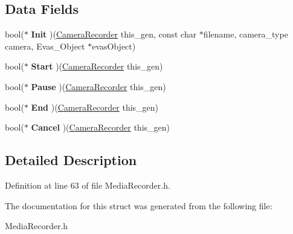 \subsection*{Data Fields}
\begin{DoxyCompactItemize}
\item 
\hypertarget{struct__CameraRecorder_a3e6b2c98f714ddad1dc9d44ebe0d9efe}{bool($\ast$ {\bfseries Init} )(\hyperlink{struct__CameraRecorder}{Camera\-Recorder} this\-\_\-gen, const char $\ast$filename, camera\-\_\-type camera, Evas\-\_\-\-Object $\ast$evas\-Object)}\label{struct__CameraRecorder_a3e6b2c98f714ddad1dc9d44ebe0d9efe}

\item 
\hypertarget{struct__CameraRecorder_ae43053507ae72e6626706b58714b1933}{bool($\ast$ {\bfseries Start} )(\hyperlink{struct__CameraRecorder}{Camera\-Recorder} this\-\_\-gen)}\label{struct__CameraRecorder_ae43053507ae72e6626706b58714b1933}

\item 
\hypertarget{struct__CameraRecorder_a67e8972e6f13553d53b16f05300b609c}{bool($\ast$ {\bfseries Pause} )(\hyperlink{struct__CameraRecorder}{Camera\-Recorder} this\-\_\-gen)}\label{struct__CameraRecorder_a67e8972e6f13553d53b16f05300b609c}

\item 
\hypertarget{struct__CameraRecorder_abb8e94291e824e486921cb264532dd03}{bool($\ast$ {\bfseries End} )(\hyperlink{struct__CameraRecorder}{Camera\-Recorder} this\-\_\-gen)}\label{struct__CameraRecorder_abb8e94291e824e486921cb264532dd03}

\item 
\hypertarget{struct__CameraRecorder_a9dc99528b9927d9cb686e2a88a06c4ea}{bool($\ast$ {\bfseries Cancel} )(\hyperlink{struct__CameraRecorder}{Camera\-Recorder} this\-\_\-gen)}\label{struct__CameraRecorder_a9dc99528b9927d9cb686e2a88a06c4ea}

\end{DoxyCompactItemize}


\subsection{Detailed Description}


Definition at line 63 of file Media\-Recorder.\-h.



The documentation for this struct was generated from the following file\-:\begin{DoxyCompactItemize}
\item 
Media\-Recorder.\-h\end{DoxyCompactItemize}
